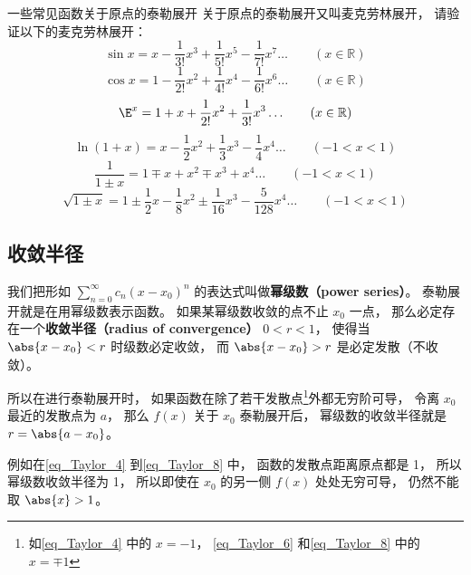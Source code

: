 \begin{exercise}{一些常见函数关于原点的泰勒展开}
关于原点的泰勒展开又叫麦克劳林展开， 请验证以下的麦克劳林展开：
\begin{equation}\label{eq_Taylor_10}
\sin x = x - \frac{1}{3!} x^3 + \frac{1}{5!} x^5 - \frac{1}{7!} x^7 \ldots
\qquad (x \in \mathbb R)
\end{equation}
\begin{equation}
\cos x = 1 - \frac{1}{2!} x^2 + \frac{1}{4!} x^4 -\frac{1}{6!} x^6 \ldots
\qquad (x \in \mathbb R)
\end{equation}
\begin{equation}\label{eq_Taylor_11}
\E^x =1 + x + \frac{1}{2!} x^2 + \frac{1}{3!} x^3  \ldots
\qquad (x \in \mathbb R)
\end{equation}
\begin{equation}\label{eq_Taylor_4}
\ln (1+x) = x - \frac12 x^2 + \frac13 x^3 - \frac14 x^4 \ldots
\qquad (-1 < x < 1)
\end{equation}
\begin{equation}\label{eq_Taylor_6}
\frac{1}{1 \pm x} = 1 \mp x + x^2 \mp x^3 + x^4 \ldots
\qquad (-1 < x < 1)
\end{equation}
\begin{equation}\label{eq_Taylor_8}
\sqrt{1\pm x} = 1 \pm \frac12 x - \frac18 x^2 \pm \frac{1}{16} x^3 - \frac{5}{128}x^4 \ldots
\qquad (-1 < x < 1)
\end{equation}
\end{exercise}

\subsection{收敛半径}
我们把形如 $\sum_{n=0}^\infty c_n (x-x_0)^n$ 的表达式叫做\textbf{幂级数（power series）}。 泰勒展开就是在用幂级数表示函数。 如果某幂级数收敛的点不止 $x_0$ 一点， 那么必定存在一个\textbf{收敛半径（radius of convergence）} $0 < r < 1$， 使得当 $\abs{x-x_0} < r$ 时级数必定收敛， 而 $\abs{x-x_0} > r$ 是必定发散（不收敛）。

所以在进行泰勒展开时， 如果函数在除了若干发散点\footnote{如\autoref{eq_Taylor_4} 中的 $x = -1$， \autoref{eq_Taylor_6} 和\autoref{eq_Taylor_8} 中的 $x = \mp 1$}外都无穷阶可导， 令离 $x_0$ 最近的发散点为 $a$， 那么 $f(x)$ 关于 $x_0$ 泰勒展开后， 幂级数的收敛半径就是 $r = \abs{a - x_0}$。

例如在\autoref{eq_Taylor_4} 到\autoref{eq_Taylor_8} 中， 函数的发散点距离原点都是 1， 所以幂级数收敛半径为 1， 所以即使在 $x_0$ 的另一侧 $f(x)$ 处处无穷可导， 仍然不能取 $\abs{x} > 1$。

